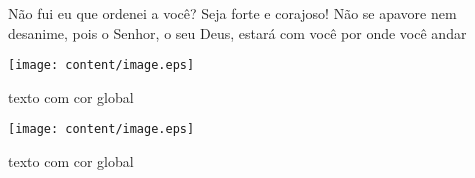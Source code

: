 \documentclass[20pt,extrafontsizes,twoside]{memoir}
\begin{document}




\begin{slide-frame}
\thispagestyle{empty}
\end{slide-frame}

\begin{slide-frame-center}
\noindent
Não fui eu que ordenei a você? Seja forte e corajoso! Não se apavore nem desanime, 
pois o Senhor, o seu Deus, estará com você por onde você andar
\end{slide-frame-center}

\begin{slide-frame}
\centering
\texttt{[image: content/image.eps]}
\end{slide-frame}

\begin{slide-frame}
\begin{book-box}texto com cor global\end{book-box}
\lipsum[1][1-2]
\end{slide-frame}

\begin{slide-frame}
\centering
\lipsum[1][1-3]

\texttt{[image: content/image.eps]}
\begin{book-box}texto com cor global\end{book-box}
\end{slide-frame}




\end{document}
